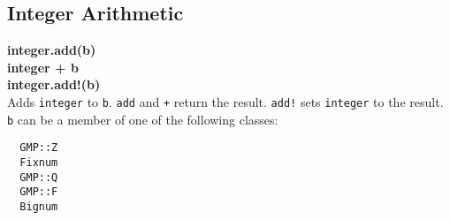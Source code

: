 \documentclass[pdftex,10pt]{article}
\begin{document}
\subsection{Integer Arithmetic}

\large{\textbf{integer.add(b)}}\\
\large{\textbf{integer + b}}\\
\large{\textbf{integer.add!(b)}}\\
Adds \texttt{integer} to \texttt{b}. \texttt{add} and \texttt{+} return the result.
\texttt{add!} sets \texttt{integer} to the result. \texttt{b} can be a member of one of
the following classes:
\begin{verbatim}
  GMP::Z
  Fixnum
  GMP::Q
  GMP::F
  Bignum
\end{verbatim}
\end{document}
